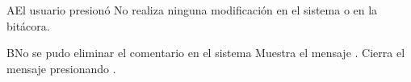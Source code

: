 
\label{SP2-CU16-A}
\begin{UCtrayectoriaA}{A}{El usuario presionó }
  \UCpaso No realiza ninguna modificación en el sistema o en la bitácora.
\end{UCtrayectoriaA}

\label{SP2-CU16-B}
\begin{UCtrayectoriaA}{B}{No se pudo eliminar el comentario en el sistema}
  \UCpaso Muestra el mensaje .
  \UCpaso[\UCactor] Cierra el mensaje presionando .
\end{UCtrayectoriaA}
